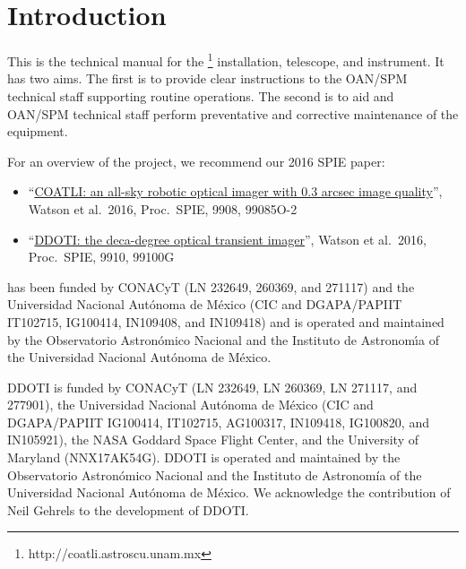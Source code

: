 \chapter{Introduction}
\label{chapter:introduction}

This is the technical manual for the {\projectname}\footnote{http://coatli.astroscu.unam.mx} installation, telescope, and instrument. It has two aims. The first is to provide clear instructions to the OAN/SPM technical staff supporting routine operations. The second is to aid {\projectname} and OAN/SPM technical staff perform preventative and corrective maintenance of the equipment.

For an overview of the {\projectname} project, we recommend our 2016 SPIE paper:

\ifcoatlioan
\begin{itemize}
\item “\href{bibliography/spie-coatli-2016.pdf}{COATLI: an all-sky robotic optical imager with 0.3 arcsec image quality}”,   Watson et al.\ 2016, Proc.\ SPIE, 9908, 99085O-2
\end{itemize}
\fi

\ifddotioan
\begin{itemize}
\item “\href{bibliography/spie-ddoti-2016.pdf}{DDOTI: the deca-degree optical transient imager}”, Watson et al.\ 2016, Proc.\ SPIE, 9910, 99100G
\end{itemize}
\fi

\ifcoatlioan
{\projectname} has been funded by CONACyT (LN 232649, 260369, and 271117)
and the Universidad Nacional Aut\'onoma de M\'exico (CIC and
DGAPA/PAPIIT IT102715, IG100414, IN109408, and IN109418) and is operated and
maintained by the Observatorio Astron\'omico Nacional and the Instituto
de Astronom{\'\i}a of the Universidad Nacional Aut\'onoma de M\'exico.
\fi

\ifddotioan
DDOTI is funded by CONACyT (LN 232649, LN 260369, LN 271117, and 277901), the Universidad Nacional Autónoma de México (CIC and DGAPA/PAPIIT IG100414, IT102715, AG100317, IN109418, IG100820, and IN105921), the NASA Goddard Space Flight Center, and the University of Maryland (NNX17AK54G). DDOTI is operated and maintained by the Observatorio Astronómico Nacional and the Instituto de Astronomía of the Universidad Nacional Autónoma de México. We acknowledge the contribution of Neil Gehrels to the development of DDOTI.
\fi
